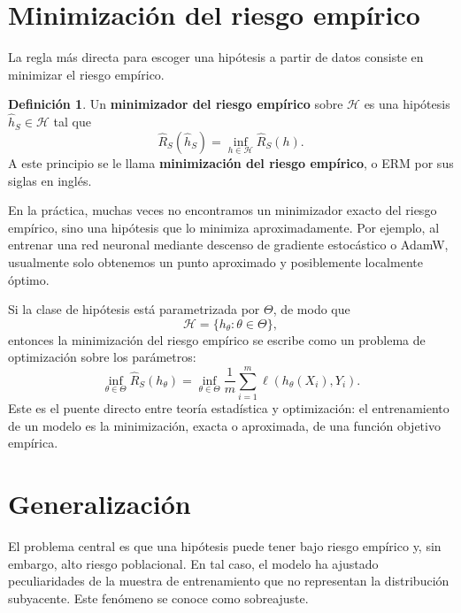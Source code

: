 \documentclass[11pt]{report}
\newenvironment{tcolorbox}[1][]{\par\medskip\noindent\ignorespaces}{\par\medskip}
\theoremstyle{definition}
\newtheorem{definicion}{Definición}[section]
\theoremstyle{plain}
\numberwithin{equation}{section}
\begin{document}
\section{Minimización del riesgo empírico}

La regla más directa para escoger una hipótesis a partir de datos consiste en minimizar el riesgo empírico.

\begin{tcolorbox}[colback=blue!8, colframe=blue!8, boxrule=0pt]
\begin{definicion}
Un \textbf{minimizador del riesgo empírico} sobre \(\mathcal{H}\) es una hipótesis \(\widehat{h}_S\in\mathcal{H}\) tal que
\begin{equation*}
    \widehat{R}_S(\widehat{h}_S)
    =
    \inf_{h\in\mathcal{H}}
    \widehat{R}_S(h).
\end{equation*}
A este principio se le llama \textbf{minimización del riesgo empírico}, o ERM por sus siglas en inglés.
\end{definicion}
\end{tcolorbox}

En la práctica, muchas veces no encontramos un minimizador exacto del riesgo empírico, sino una hipótesis que lo minimiza aproximadamente. Por ejemplo, al entrenar una red neuronal mediante descenso de gradiente estocástico o AdamW, usualmente solo obtenemos un punto aproximado y posiblemente localmente óptimo.

Si la clase de hipótesis está parametrizada por \(\Theta\), de modo que
\begin{equation*}
    \mathcal{H}=\{h_\theta:\theta\in\Theta\},
\end{equation*}
entonces la minimización del riesgo empírico se escribe como un problema de optimización sobre los parámetros:
\begin{equation*}
    \inf_{\theta\in\Theta}
    \widehat{R}_S(h_\theta)
    =
    \inf_{\theta\in\Theta}
    \frac{1}{m}
    \sum_{i=1}^{m}
    \ell(h_\theta(X_i),Y_i).
\end{equation*}
Este es el puente directo entre teoría estadística y optimización: el entrenamiento de un modelo es la minimización, exacta o aproximada, de una función objetivo empírica.

\section{Generalización}

El problema central es que una hipótesis puede tener bajo riesgo empírico y, sin embargo, alto riesgo poblacional. En tal caso, el modelo ha ajustado peculiaridades de la muestra de entrenamiento que no representan la distribución subyacente. Este fenómeno se conoce como sobreajuste.
\end{document}
